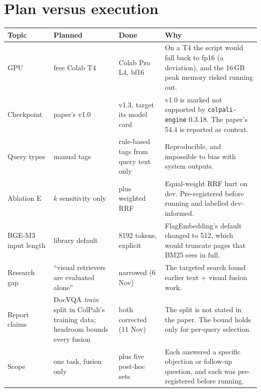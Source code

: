\documentclass[11pt,a4paper]{article}
\begin{document}
\section{Plan versus execution}
\label{app:plan}
\begin{center}\footnotesize\setlength{\tabcolsep}{4pt}
\begin{tabular}{p{2.6cm} p{3.6cm} p{3.9cm} p{5.0cm}}
\toprule
Topic & Planned & Done & Why \\
\midrule
GPU & free Colab T4 & Colab Pro L4, bf16 & On a T4 the script would fall back to fp16 (a deviation), and the 16\,GB peak memory risked running out. \\
Checkpoint & paper's v1.0 & v1.3, target its model card & v1.0 is marked not supported by \texttt{colpali-engine} 0.3.18. The paper's 54.4 is reported as context. \\
Query types & manual tags & rule-based tags from query text only & Reproducible, and impossible to bias with system outputs. \\
Ablation E & $k$ sensitivity only & plus weighted RRF & Equal-weight RRF hurt on dev. Pre-registered before running and labelled dev-informed. \\
BGE-M3 input length & library default & 8192 tokens, explicit & FlagEmbedding's default changed to 512, which would truncate pages that BM25 sees in full. \\
Research gap & ``visual retrievers are evaluated alone'' & narrowed (6 Nov) & The targeted search found earlier text + visual fusion work. \\
Report claims & DocVQA \emph{train} split in ColPali's training data; headroom bounds every fusion & both corrected (11 Nov) & The split is not stated in the paper. The bound holds only for per-query selection. \\
Scope & one task, fusion only & plus five post-hoc sets & Each answered a specific objection or follow-up question, and each was pre-registered before running. \\
\bottomrule
\end{tabular}
\end{center}

\end{document}
